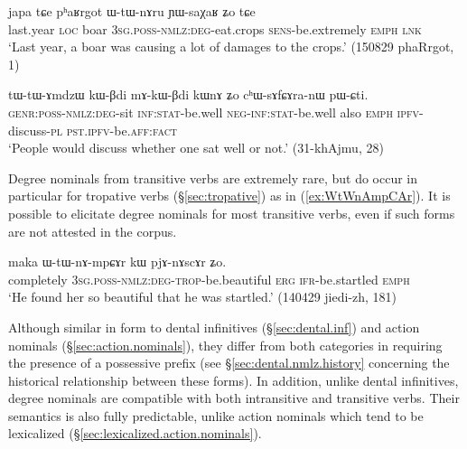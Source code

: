 \begin{exe}
\ex \label{ex:WtWnAru}
\gll  japa tɕe pʰaʁrgot ɯ-tɯ-nɤru ɲɯ-saχaʁ ʑo tɕe \\
last.year \textsc{loc} boar  \textsc{3sg}.\textsc{poss}-\textsc{nmlz}:\textsc{deg}-eat.crops \textsc{sens}-be.extremely \textsc{emph} \textsc{lnk} \\
\glt `Last year, a boar was causing a lot of damages to the crops.' (150829 phaRrgot, 1)
\end{exe}

\begin{exe}
\ex \label{ex:tWtAmdzW.kWBdi}
\gll tɯ-tɯ-ɤmdzɯ kɯ-βdi mɤ-kɯ-βdi kɯnɤ ʑo cʰɯ-sɤfɕɤra-nɯ pɯ-ɕti.  \\
\textsc{genr}:\textsc{poss}-\textsc{nmlz}:\textsc{deg}-sit \textsc{inf}:\textsc{stat}-be.well \textsc{neg}-\textsc{inf}:\textsc{stat}-be.well also \textsc{emph} \textsc{ipfv}-discuss-\textsc{pl} \textsc{pst}.\textsc{ipfv}-be.\textsc{aff}:\textsc{fact} \\
\glt `People would discuss whether one sat well or not.' (31-khAjmu, 28)
\end{exe}

Degree nominals from transitive verbs are extremely rare, but do occur in particular for tropative verbs (§\ref{sec:tropative}) as in (\ref{ex:WtWnAmpCAr}). It is possible to elicitate degree nominals for most transitive verbs, even if such forms are not attested in the corpus.
 
\begin{exe}
\ex \label{ex:WtWnAmpCAr}
\gll  maka ɯ-tɯ-nɤ-mpɕɤr kɯ pjɤ-nɤscɤr ʑo. \\
completely  \textsc{3sg}.\textsc{poss}-\textsc{nmlz}:\textsc{deg}-\textsc{trop}-be.beautiful \textsc{erg} \textsc{ifr}-be.startled \textsc{emph} \\
\glt `He found her so beautiful that he was startled.' (140429 jiedi-zh, 181)
\end{exe} 
 
Although similar in form to dental infinitives (§\ref{sec:dental.inf}) and action nominals (§\ref{sec:action.nominals}), they differ from both categories in requiring the presence of a possessive prefix (see §\ref{sec:dental.nmlz.history} concerning the historical relationship between these forms). In addition, unlike dental infinitives, degree nominals are compatible with both intransitive and transitive verbs. Their semantics is also fully predictable, unlike action nominals which tend to be lexicalized (§\ref{sec:lexicalized.action.nominals}).

